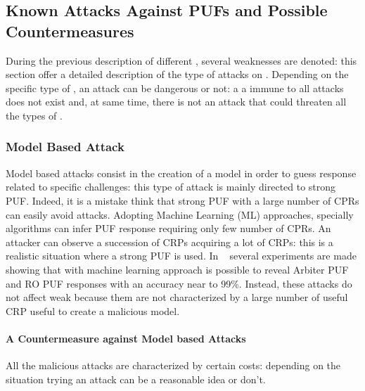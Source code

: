 \documentclass[../tesi.tex]{subfiles}
\begin{document}
\subsection{Known Attacks Against PUFs and Possible Countermeasures} 
During the previous description of different , several weaknesses are denoted: this section offer a detailed description of the type of attacks on . Depending on the specific type of \puf{}, an attack can be dangerous or not: a \puf{} a immune to all attacks does not exist and, at same time, there is not an attack that could threaten all the types of . 
\subsubsection{Model Based Attack}
Model based attacks consist in the creation of a model in order to guess response related to specific challenges: this type of attack is mainly directed to strong PUF. Indeed, it is a mistake think that strong PUF with a large number of CPRs can easily avoid attacks. Adopting Machine Learning (ML) approaches, specially algorithms can infer PUF response requiring only few number of CPRs.
An attacker can observe a succession of CRPs acquiring a lot of CRPs: this is a realistic situation where a strong PUF is used. In  ~\cite{ruhrmair2010modeling} several experiments are made showing that with machine learning approach is possible to reveal Arbiter PUF and RO PUF responses with an accuracy near to 99\%. Instead, these attacks do not affect weak  because them are not characterized by a large number of useful CRP useful to create a malicious model. 
\paragraph{A Countermeasure against Model based Attacks} \label{par:countermeasuremodeling}
All the malicious attacks are characterized by certain costs:  depending on the situation trying an attack can be a reasonable idea or don't. 
\end{document}
